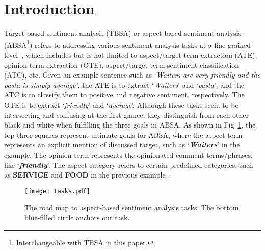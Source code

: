 \documentclass[letterpaper]{article} \usepackage{aaai20}  \usepackage{times}  \usepackage{helvet} \usepackage{courier}  \usepackage[hyphens]{url}  \usepackage{graphicx} \urlstyle{rm} \def\UrlFont{\rm}  \usepackage{graphicx}  \frenchspacing  \setlength{\pdfpagewidth}{8.5in}  \setlength{\pdfpageheight}{11in}
\begin{document}
\section{Introduction}\label{sec:introduction}
Target-based sentiment analysis (TBSA) or aspect-based sentiment analysis (ABSA\footnote{Interchangeable with TBSA in this paper.}) refers to addressing various sentiment analysis tasks at a fine-grained level~\cite{liu2012sentiment,S14-2004}, which includes but is not limited to aspect/target term extraction (ATE), opinion term extraction (OTE), aspect/target term sentiment classification (ATC), etc. Given an example sentence such as \textit{`Waiters are very friendly and the pasta is simply average'}, the ATE is to extract `\textit{Waiters}' and `\textit{pasta}', and the ATC is to classify them to positive and negative sentiment, respectively. The OTE is to extract `\textit{friendly}' and `\textit{average}'.
Although these tasks seem to be intersecting and confusing at the first glance, they distinguish from each other black and white when fulfilling the three goals in ABSA. As shown in Fig~\ref{fig:tasks}, the top three squares represent ultimate goals for ABSA, where the aspect term represents an explicit mention of discussed target, such as `\textit{\textbf{Waiters}}' in the example. The opinion term represents the opinionated comment terms/phrases, like `\textit{\textbf{friendly}}'. The aspect category refers to certain predefined categories, such as \textbf{SERVICE} and \textbf{FOOD} in the previous example~\cite{wang2019aspect,S15-2082}. 




    \begin{figure}[!t]
        \centering
        \texttt{[image: tasks.pdf]}
        \caption{The road map to aspect-based sentiment analysis tasks. The bottom blue-filled circle anchors our task.}
        \label{fig:tasks}
    \end{figure}
    
\end{document}
